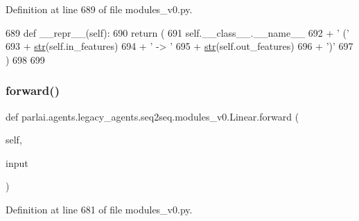 Definition at line 689 of file modules\+\_\+v0.\+py.


\begin{DoxyCode}
689     \textcolor{keyword}{def }\_\_repr\_\_(self):
690         \textcolor{keywordflow}{return} (
691             self.\_\_class\_\_.\_\_name\_\_
692             + \textcolor{stringliteral}{' ('}
693             + \hyperlink{namespacegenerate__task__READMEs_a5b88452ffb87b78c8c85ececebafc09f}{str}(self.in\_features)
694             + \textcolor{stringliteral}{' -> '}
695             + \hyperlink{namespacegenerate__task__READMEs_a5b88452ffb87b78c8c85ececebafc09f}{str}(self.out\_features)
696             + \textcolor{stringliteral}{')'}
697         )
698 
699 
\end{DoxyCode}
\mbox{\label{classparlai_1_1agents_1_1legacy__agents_1_1seq2seq_1_1modules__v0_1_1Linear_a5114a45ac1b8e2a07c399da5bff760be}} 
\subsubsection{\texorpdfstring{forward()}{forward()}}
{\footnotesize\ttfamily def parlai.\+agents.\+legacy\+\_\+agents.\+seq2seq.\+modules\+\_\+v0.\+Linear.\+forward (\begin{DoxyParamCaption}\item[{}]{self,  }\item[{}]{input }\end{DoxyParamCaption})}



Definition at line 681 of file modules\+\_\+v0.\+py.


